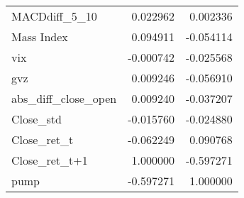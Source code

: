 \begin{tabular}{lrr}
MACDdiff\_5\_10             &       0.022962 &  0.002336 \\
Mass Index                &       0.094911 & -0.054114 \\
vix                       &      -0.000742 & -0.025568 \\
gvz                       &       0.009246 & -0.056910 \\
abs\_diff\_close\_open       &       0.009240 & -0.037207 \\
Close\_std                 &      -0.015760 & -0.024880 \\
Close\_ret\_t               &      -0.062249 &  0.090768 \\
Close\_ret\_t+1             &       1.000000 & -0.597271 \\
pump                      &      -0.597271 &  1.000000 \\
\bottomrule
\end{tabular}
